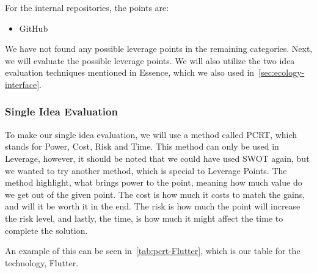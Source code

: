 For the internal repositories, the points are:

\begin{itemize}
    \item GitHub
\end{itemize}

We have not found any possible leverage points in the remaining categories.
Next, we will evaluate the possible leverage points. 
We will also utilize the two idea evaluation techniques mentioned in Essence, which we also used in~\autoref{sec:ecology-interface}.

\subsubsection{Single Idea Evaluation}
To make our single idea evaluation, we will use a method called PCRT, which stands for Power, Cost, Risk and Time.
This method can only be used in Leverage, however, it should be noted that we could have used SWOT again, but we wanted to try another method, which is special to Leverage Points.
The method highlight, what brings power to the point, meaning how much value do we get out of the given point.
The cost is how much it costs to match the gains, and will it be worth it in the end.
The risk is how much the point will increase the risk level, and lastly, the time, is how much it might affect the time to complete the solution.

An example of this can be seen in~\autoref{tab:pcrt-Flutter}, which is our table for the technology, Flutter.

\begin{table}[h]
    \centering
    \caption{PCRT analysis of Flutter in technologies.}
    \label{tab:pcrt-Flutter}
\end{table}


